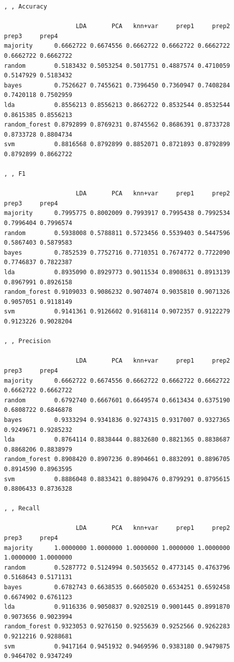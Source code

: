 \documentclass[
]{article}
\begin{document}
\begin{verbatim}
, , Accuracy

                    LDA       PCA   knn+var     prep1     prep2     prep3     prep4
majority      0.6662722 0.6674556 0.6662722 0.6662722 0.6662722 0.6662722 0.6662722
random        0.5183432 0.5053254 0.5017751 0.4887574 0.4710059 0.5147929 0.5183432
bayes         0.7526627 0.7455621 0.7396450 0.7360947 0.7408284 0.7420118 0.7502959
lda           0.8556213 0.8556213 0.8662722 0.8532544 0.8532544 0.8615385 0.8556213
random_forest 0.8792899 0.8769231 0.8745562 0.8686391 0.8733728 0.8733728 0.8804734
svm           0.8816568 0.8792899 0.8852071 0.8721893 0.8792899 0.8792899 0.8662722

, , F1

                    LDA       PCA   knn+var     prep1     prep2     prep3     prep4
majority      0.7995775 0.8002009 0.7993917 0.7995438 0.7992534 0.7996404 0.7996574
random        0.5938008 0.5788811 0.5723456 0.5539403 0.5447596 0.5867403 0.5879583
bayes         0.7852539 0.7752716 0.7710351 0.7674772 0.7722090 0.7746837 0.7822387
lda           0.8935090 0.8929773 0.9011534 0.8908631 0.8913139 0.8967991 0.8926158
random_forest 0.9109033 0.9086232 0.9074074 0.9035810 0.9071326 0.9057051 0.9118149
svm           0.9141361 0.9126602 0.9168114 0.9072357 0.9122279 0.9123226 0.9028204

, , Precision

                    LDA       PCA   knn+var     prep1     prep2     prep3     prep4
majority      0.6662722 0.6674556 0.6662722 0.6662722 0.6662722 0.6662722 0.6662722
random        0.6792740 0.6667601 0.6649574 0.6613434 0.6375190 0.6808722 0.6846878
bayes         0.9333294 0.9341836 0.9274315 0.9317007 0.9327365 0.9249671 0.9285232
lda           0.8764114 0.8838444 0.8832680 0.8821365 0.8838687 0.8868206 0.8838979
random_forest 0.8908420 0.8907236 0.8904661 0.8832091 0.8896705 0.8914590 0.8963595
svm           0.8886048 0.8833421 0.8890476 0.8799291 0.8795615 0.8806433 0.8736328

, , Recall

                    LDA       PCA   knn+var     prep1     prep2     prep3     prep4
majority      1.0000000 1.0000000 1.0000000 1.0000000 1.0000000 1.0000000 1.0000000
random        0.5287772 0.5124994 0.5035652 0.4773145 0.4763796 0.5168643 0.5171131
bayes         0.6782743 0.6638535 0.6605020 0.6534251 0.6592458 0.6674902 0.6761123
lda           0.9116336 0.9050837 0.9202519 0.9001445 0.8991870 0.9073656 0.9023994
random_forest 0.9323053 0.9276150 0.9255639 0.9252566 0.9262283 0.9212216 0.9288681
svm           0.9417164 0.9451932 0.9469596 0.9383180 0.9479875 0.9464702 0.9347249


\end{verbatim}
\end{document}
